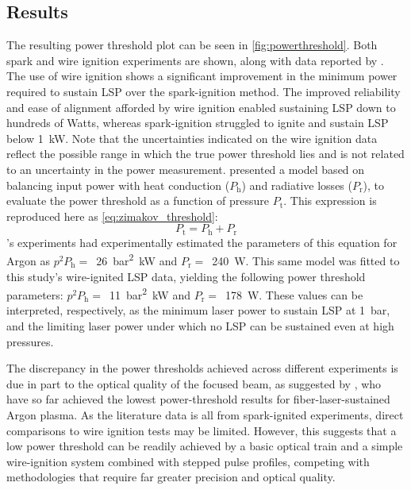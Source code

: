         \subsection{Results}
            The resulting power threshold plot can be seen in \autoref{fig:powerthreshold}. Both spark and wire ignition experiments are shown, along with data reported by \textcite{zimakovInteractionNearIRLaser2016,matsuiGeneratingConditionsArgon2019,luCharacteristicDiagnosticsLaserStabilized2022}. The use of wire ignition shows a significant improvement in the minimum power required to sustain LSP over the spark-ignition method. The improved reliability and ease of alignment afforded by wire ignition enabled sustaining LSP down to hundreds of Watts, whereas spark-ignition struggled to ignite and sustain LSP below \qty{1}{kW}. Note that the uncertainties indicated on the wire ignition data reflect the possible range in which the true power threshold lies and is not related to an uncertainty in the power measurement. \textcite{zimakovInteractionNearIRLaser2016} presented a model based on balancing input power with heat conduction ($P_\mathrm{h}$) and radiative losses ($P_\mathrm{r}$), to evaluate the power threshold as a function of pressure $P_\mathrm{t}$. This expression is reproduced here as \autoref{eq:zimakov_threshold}:
            \begin{equation} \label{eq:zimakov_threshold}
                P_\mathrm{t} = P_\mathrm{h} + P_\mathrm{r}
            \end{equation}
            \citeauthor{zimakovInteractionNearIRLaser2016}'s experiments had experimentally estimated the parameters of this equation for Argon as $p^2P_\mathrm{h} =$~\qty{26}{bar^2.kW} and $P_\mathrm{r} =$~\qty{240}{W}. This same model was fitted to this study's wire-ignited LSP data, yielding the following power threshold parameters: $p^2P_\mathrm{h} =$~\qty{11}{bar^2.kW} and $P_\mathrm{r} =$~\qty{178}{W}. These values can be interpreted, respectively, as the minimum laser power to sustain LSP at \qty{1}{bar}, and the limiting laser power under which no LSP can be sustained even at high pressures.

            The discrepancy in the power thresholds achieved across different experiments is due in part to the optical quality of the focused beam, as suggested by \textcite{luCharacteristicDiagnosticsLaserStabilized2022}, who have so far achieved the lowest power-threshold results for fiber-laser-sustained Argon plasma. As the literature data is all from spark-ignited experiments, direct comparisons to wire ignition tests may be limited. However, this suggests that a low power threshold can be readily achieved by a basic optical train and a simple wire-ignition system combined with stepped pulse profiles, competing with methodologies that require far greater precision and optical quality.

